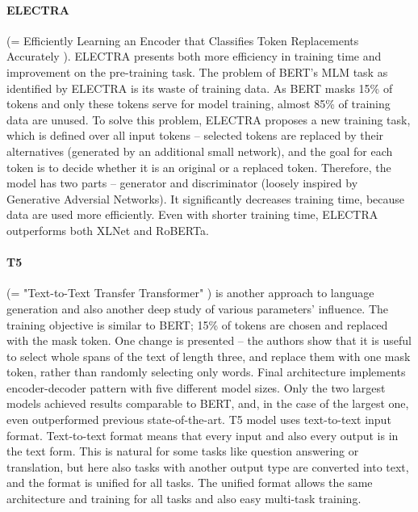 \paragraph{ELECTRA} (= Efficiently Learning an Encoder that Classifies Token Replacements Accurately \citep{Clark2020}). ELECTRA presents both more efficiency in training time and improvement on the pre-training task. The problem of BERT's MLM task as identified by ELECTRA is its waste of training data. As BERT masks 15\% of tokens and only these tokens serve for model training, almost 85\% of training data are unused. To solve this problem, ELECTRA proposes a new training task, which is defined over all input tokens -- selected tokens are replaced by their alternatives (generated by an additional small network), and the goal for each token is to decide whether it is an original or a replaced token. Therefore, the model has two parts -- generator and discriminator (loosely inspired by Generative Adversial Networks). It significantly decreases training time, because data are used more efficiently. Even with shorter training time, ELECTRA outperforms both XLNet and RoBERTa.
\paragraph{T5} (= "Text-to-Text Transfer Transformer" \citep{Raffel2019a}) is another approach to language generation and also another deep study of various parameters' influence. The training objective is similar to BERT; 15\% of tokens are chosen and replaced with the mask token. One change is presented -- the authors show that it is useful to select whole spans of the text of length three, and replace them with one mask token, rather than randomly selecting only words. Final architecture implements encoder-decoder pattern with five different model sizes. Only the two largest models achieved results comparable to BERT, and, in the case of the largest one, even outperformed previous state-of-the-art. T5 model uses text-to-text input format. Text-to-text format means that every input and also every output is in the text form. This is natural for some tasks like question answering or translation, but here also tasks with another output type are converted into text, and the format is unified for all tasks. The unified format allows the same architecture and training for all tasks and also easy multi-task training.  
